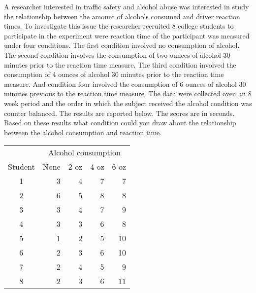 A researcher interested in traffic safety and alcohol abuse was interested in study the relationship between the amount of alcohols consumed and driver reaction times. To investigate this issue the researcher recruited 8 college students to participate in the experiment were reaction time of the participant was measured under four conditions. The first condition involved no consumption of alcohol. The second condition involves the consumption of two ounces of alcohol 30 minutes prior to the reaction time measure. The third condition involved the consumption of 4 ounces of alcohol 30 minutes prior to the reaction time measure. And condition four involved the consumption of 6 ounces of alcohol 30 minutes previous to the reaction time measure. The data were collected oven an 8 week period and the order in which the subject received the alcohol condition was counter balanced. The results are reported below. The scores are in seconds. Based on these results what condition could you draw about the relationship between the alcohol consumption and reaction time.

\begin{table}[!htb]
		\centering
        \begin{tabular}{crrrr}
						 & \multicolumn{4}{c}{Alcohol consumption} \\
						\cline{2-5}
            Student & None & 2 oz & 4 oz & 6 oz \\
						1 & 3 & 4 & 7 & 7 \\
						2 & 6 & 5 & 8 & 8 \\
						3 & 3 & 4 & 7 & 9 \\
						4 & 3 & 3 & 6 & 8 \\
						5 & 1 & 2 & 5 & 10 \\
						6 & 2 & 3 & 6 & 10 \\
						7 & 2 & 4 & 5 & 9 \\
						8 & 2 & 3 & 6 & 11 \\
        \end{tabular}
\end{table}

